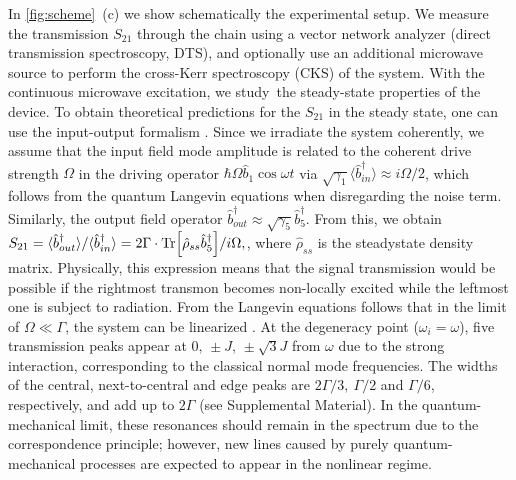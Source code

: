 \documentclass[%
 aps, prl,
 amsmath,amssymb,
 reprint,%
superscriptaddress
]{revtex4-2}
\begin{document}
In \autoref{fig:scheme}~(c) we show schematically the experimental setup. We measure the transmission $S_{21}$ through the chain using a vector network analyzer (direct transmission spectroscopy, DTS), and optionally use an additional microwave source to perform the cross-Kerr spectroscopy (CKS) of the system. With the continuous microwave excitation, we study the steady-state properties of the device. To obtain theoretical predictions for the $S_{21}$ in the steady state, one can use the input-output formalism \cite{yurke1984quantum,gardiner1985input}. Since we irradiate the system coherently, we assume that the input field mode amplitude is related to the coherent drive strength $\Omega$ in the driving operator $\hbar \Omega \hat b_1 \cos \omega t$ via $\sqrt{\gamma_1} \langle  \hat b_{in}^\dag \rangle \approx i \Omega/2$, which follows from the quantum Langevin equations when disregarding the noise term. Similarly, the output field operator $\hat b_{out}^\dag \approx \sqrt{\gamma_5} \hat b_5^\dag$. From this, we obtain $
	S_{21} = \langle \hat b_{out}^\dag\rangle / \langle \hat b_{in}^\dag \rangle = 2\Gamma\cdot \Tr[\hat \rho_{ss} \hat b_5^\dag]/{i\Omega} ,
$,
where $\hat \rho_{ss}$ is the steadystate density matrix. Physically, this expression means that the signal transmission would be possible if the rightmost transmon becomes non-locally excited while the leftmost one is subject to radiation. From the Langevin equations follows that in the limit of $\Omega \ll \Gamma$, the system can be linearized \cite{astafiev2010resonance}. At the degeneracy point ($\omega_i = \omega$), five transmission peaks appear at $0,\, \pm J,\, \pm \sqrt{3} J$ from $\omega$ due to the strong interaction, corresponding to the classical normal mode frequencies. The widths of the central, next-to-central and edge peaks are $2\Gamma/3,\ \Gamma/2$ and $\Gamma/6$, respectively, and add up to $2\Gamma$ (see Supplemental Material).  In the quantum-mechanical limit, these resonances should remain in the spectrum due to the correspondence principle; however, new lines caused by purely quantum-mechanical processes are expected to appear in the nonlinear regime.
\end{document}
